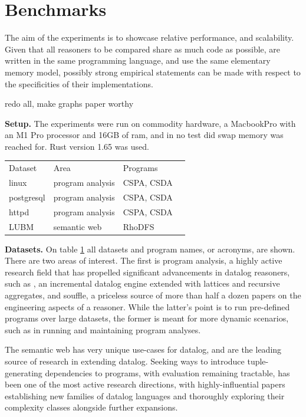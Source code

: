 \documentclass[sigconf,screen,review,natbib]{acmart}
\theoremstyle{definition}
\begin{document}
\section{Benchmarks}
The aim of the experiments is to showcase relative performance, and scalability. Given that all reasoners to be compared share as much code as possible, are written in the same
programming language, and use the same elementary memory model, possibly strong empirical statements can be made with respect to the specificities of their implementations.


redo all, make graphs paper worthy


\textbf{Setup.} The experiments were run on commodity hardware, a MacbookPro with an M1 Pro processor and 16GB of ram, and in no test did swap memory was reached for.
Rust version 1.65 was used.

\begin{table}[]
	\begin{tabular}{llll}
		Dataset    & Area             & Programs   \\
		linux      & program analysis & CSPA, CSDA \\
		postgresql & program analysis & CSPA, CSDA \\
		httpd      & program analysis & CSPA, CSDA \\
		LUBM       & semantic web     & RhoDFS
	\end{tabular}
	\label{table:datasets}
\end{table}

\textbf{Datasets.} On table \ref{table:datasets} all datasets and program names, or acronyms, are shown. There are two areas of interest. The first is program analysis, a highly active research
field that has propelled significant advancements in datalog reasoners, such as \cite{incA}, an incremental datalog engine extended with lattices and recursive aggregates, and
souffle\cite{souffle}, a priceless source of more than half a dozen papers on the engineering aspects of a reasoner. While the latter's point is to run pre-defined programs over
large datasets, the former is meant for more dynamic scenarios, such as in running and maintaining program analyses.

The semantic web has very unique use-cases for datalog, and are the leading source of research in extending datalog. Seeking ways to introduce tuple-generating dependencies to
programs, with evaluation remaining tractable, has been one of the most active research directions, with highly-influential papers establishing new families of datalog
languages\cite{datalog_plus_minus} and thoroughly exploring their complexity classes alongside further expansions\cite{sticky,warded,monadic}.
\end{document}
